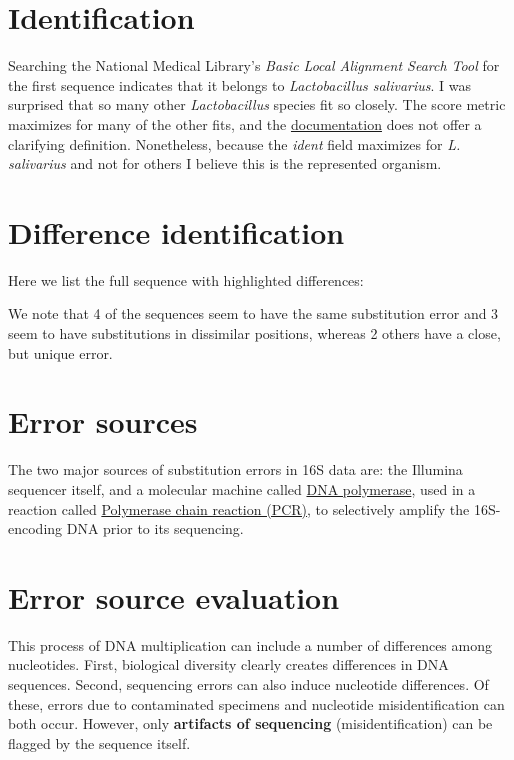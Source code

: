 \documentclass[12pt]{article}
\renewcommand{\=}[1]{\stackrel{#1}{=}} %
\theoremstyle{definition}
\begin{document}
	\section{Identification}
	Searching the National Medical Library's \textit{Basic Local Alignment Search Tool} for the first sequence indicates that it belongs to \textit{Lactobacillus salivarius}. I was surprised that so many other \textit{Lactobacillus} species fit so closely. The score metric maximizes for many of the other fits, and the \href{https://www.ncbi.nlm.nih.gov/books/NBK21106/#app8}{documentation} does not offer a clarifying definition. Nonetheless, because the \textit{ident} field maximizes for \textit{L. salivarius} and not for others I believe this is the represented organism.
	
	\section{Difference identification}
	Here we list the full sequence with highlighted differences:
	\tiny
	
	
	
	\normalsize
	We note that 4 of the sequences seem to have the same substitution error and 3 seem to have substitutions in dissimilar positions, whereas 2 others have a close, but unique error. 

	\section{Error sources}
	
	The two major sources of substitution errors in 16S data are: the Illumina sequencer itself, and a molecular machine called \underline{DNA polymerase}, used in a reaction called \linebreak\underline{Polymerase chain reaction (PCR)}, to selectively amplify the 16S-encoding DNA prior to its sequencing.
	
	\section{Error source evaluation}
	This process of DNA multiplication can include a number of differences among nucleotides. First, biological diversity clearly creates differences in DNA sequences. Second, sequencing errors can also induce nucleotide differences. Of these, errors due to contaminated specimens and nucleotide misidentification can both occur. However, only \textbf{artifacts of sequencing} (misidentification) can be flagged by the sequence itself.
\end{document}
